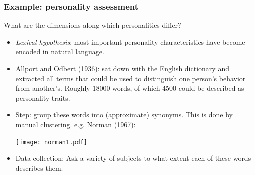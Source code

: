 \documentclass[smaller,handout]{beamer}
\def\R{{\mathbb R}}
\def\darkgreen{\color{green!60!black}}
\def\R{{\mathbb R}}
\begin{document}

\begin{frame}
\frametitle{Example: personality assessment}

\alert{What are the dimensions along which personalities differ?}
\begin{itemize}
\item<2-> {\it Lexical hypothesis}: most important personality characteristics have become encoded in natural language.
\item<3-> Allport and Odbert (1936): sat down with the English dictionary and extracted all terms that could be used to distinguish one person's behavior from another's. Roughly 18000 words, of which 4500 could be described as personality traits.
\item<4-> Step: group these words into (approximate) synonyms. This is done by manual clustering. e.g. Norman (1967):

\begin{center}
\texttt{[image: norman1.pdf]}
\end{center}

\item<5-> Data collection: Ask a variety of subjects to what extent each of these words describes them.
\end{itemize}
\end{frame}
\end{document}
